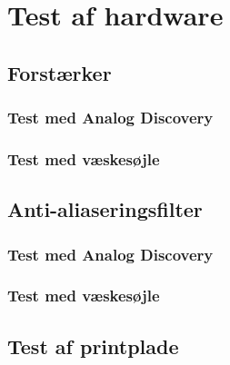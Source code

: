 \section{Test af hardware}
\subsection{Forstærker}

\subsubsection{Test med Analog Discovery}
\subsubsection{Test med væskesøjle}
\subsection{Anti-aliaseringsfilter}
\subsubsection{Test med Analog Discovery}
\subsubsection{Test med væskesøjle}
\subsection{Test af printplade}
